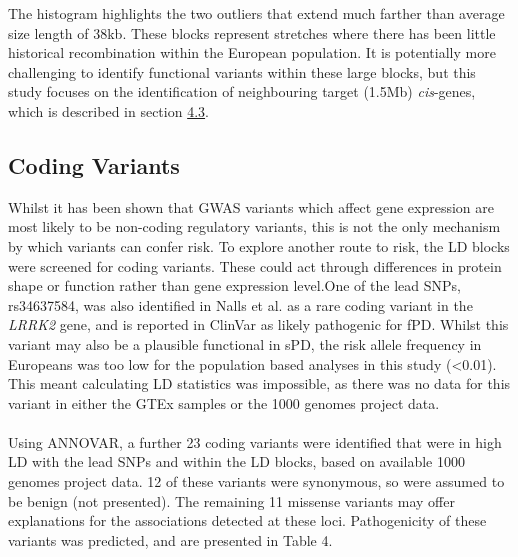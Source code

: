 \documentclass{article}
\begin{document}
The histogram highlights the two outliers that extend much farther than average size length of 38kb. These blocks represent stretches where there has been little historical recombination within the European population. It is potentially more challenging to identify functional variants within these large blocks, but this study focuses on the identification of neighbouring target (\pm1.5Mb) \textit{cis}-genes, which is described in section \hyperref[subsec:eQTLcoloc]{4.3}. 
\newpage
\subsection{Coding Variants}
\label{subsec:codingvariants}
Whilst it has been shown that GWAS variants which affect gene expression are most likely to be non-coding regulatory variants\cite{Nicolae2010Trait-AssociatedGWAS}, this is not the only mechanism by which variants can confer risk. To explore another route to risk, the LD blocks were screened for coding variants. These could act through differences in protein shape or function rather than gene expression level.One of the lead SNPs, rs34637584, was also identified in Nalls et al.\cite{Nalls2019IdentificationStudies} as a rare coding variant in the \textit{LRRK2} gene, and is reported in ClinVar as likely pathogenic for fPD. Whilst this variant may also be a plausible functional in sPD, the risk allele frequency in Europeans was too low for the population based analyses in this study (<0.01). This meant calculating LD statistics was impossible, as there was no data for this variant in either the GTEx samples or the 1000 genomes project data. 
\\
\\Using ANNOVAR\cite{Wang2010ANNOVAR:Data}, a further 23 coding variants were identified that were in high LD with the lead SNPs and within the LD blocks, based on available 1000 genomes project data. 12 of these variants were synonymous, so were assumed to be benign (not presented). The remaining 11 missense variants may offer explanations for the associations detected at these loci. Pathogenicity of these variants was predicted, and are presented in Table 4.
\end{document}
